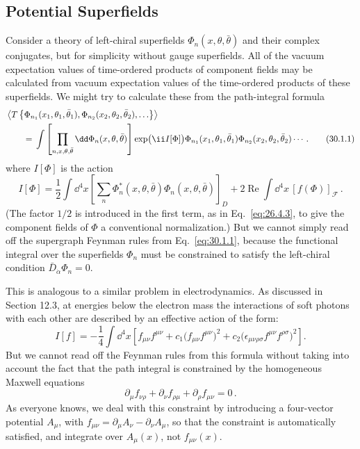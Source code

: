 
\subsection{Potential Superfields}

Consider a theory of left-chiral superfields
\(\Phi_n(x,\theta,\bar\theta)\) and their complex conjugates, but for
simplicity without gauge superfields. All of the
vacuum expectation values of time-ordered products of component fields may be
calculated from vacuum expectation values of the time-ordered products of
these superfields. We might try to calculate these from the path-integral
formula
\begin{align}
  &\left\langle
    T\left\{\Phi_{n_1}(x_1,\theta_1,\bar\theta_1),
      \Phi_{n_2}(x_2,\theta_2,\bar\theta_2),\ldots\right\}
   \right\rangle \notag\\
  &\qquad={}
  \int\left[\prod_{n,x,\theta,\bar\theta}
      \dd\Phi_n(x,\theta,\bar\theta)\right]
    \exp\bigl(\ii I[\Phi]\bigr)
    \Phi_{n_1}(x_1,\theta_1,\bar\theta_1)
    \Phi_{n_2}(x_2,\theta_2,\bar\theta_2)\cdots\,.
  \tag{30.1.1}\label{eq:30.1.1}
\end{align}
where \(I[\Phi]\) is the action
\begin{equation}
  I[\Phi]
  =\frac12\int \dd^4x
    \left[\sum_n\Phi_n^*(x,\theta,\bar\theta)
      \Phi_n(x,\theta,\bar\theta)\right]_D
   +2\operatorname{Re}\int \dd^4x\,[f(\Phi)]_{\mathcal{F}}\,.
  \tag{30.1.2}\label{eq:30.1.2}
\end{equation}
(The factor \(1/2\) is introduced in the first term, as in
Eq.~\eqref{eq:26.4.3}, to give the component fields of \(\Phi\) a conventional
normalization.) But we cannot simply read off the supergraph Feynman rules
from Eq.~\eqref{eq:30.1.1}, because the functional integral over the
superfields \(\Phi_n\) must be constrained to satisfy the left-chiral
condition \(\bar D_{\dot\alpha}\Phi_n=0\).

This is analogous to a similar problem in electrodynamics. As discussed in
Section 12.3, at energies below the electron mass the interactions of soft
photons with each other are described by an effective action of the form:
\[
  I[f]
  =-\frac14\int \dd^4x\left[
    f_{\mu\nu}f^{\mu\nu}
    +c_1\bigl(f_{\mu\nu}f^{\mu\nu}\bigr)^2
    +c_2\bigl(\epsilon_{\mu\nu\rho\sigma}
       f^{\mu\nu}f^{\rho\sigma}\bigr)^2
  \right].
\]
But we cannot read off the Feynman rules from this formula without taking
into account the fact that the path integral is constrained by the
homogeneous Maxwell equations
\[
  \partial_\mu f_{\nu\rho}
  +\partial_\nu f_{\rho\mu}
  +\partial_\rho f_{\mu\nu}=0\,.
\]
As everyone knows, we deal with this constraint by introducing a four-vector
potential \(A_\mu\), with
\(f_{\mu\nu}=\partial_\mu A_\nu-\partial_\nu A_\mu\), so that the constraint
is automatically satisfied, and integrate over \(A_\mu(x)\), not
\(f_{\mu\nu}(x)\).


